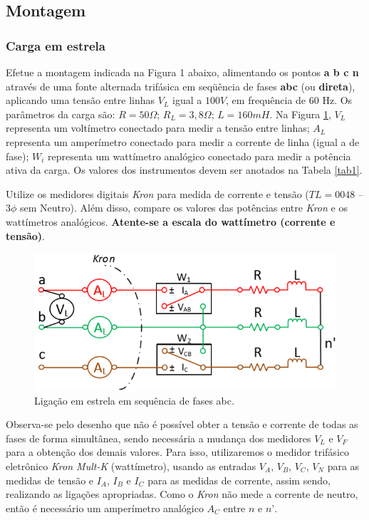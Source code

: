 \documentclass[a4paper,12pt,oneside,openany,table,xcdraw]{article}
\begin{document}
\subsection{Montagem} %

\subsubsection{Carga em estrela}
 Efetue a montagem indicada na Figura 1 abaixo, alimentando os pontos \textbf{a b c n} através de uma fonte alternada trifásica em seqüência de fases \textbf{abc} (ou \textbf{direta}), aplicando uma tensão entre linhas $V_L$ igual a $100 V$, em frequência de 60 Hz. Os parâmetros da carga são: $R = 50 \Omega$; $R_L = 3,8\Omega$; $L = 160 mH$. Na Figura \ref{fig1}, $V_L$ representa um voltímetro conectado para medir a tensão entre linhas; $A_L$ representa um amperímetro conectado para medir a corrente de linha (igual a de fase); $W_i$ representa um wattímetro analógico conectado para medir a potência ativa da carga. Os valores dos instrumentos devem ser anotados na Tabela \ref{tab1}.  

Utilize os medidores digitais \emph{Kron} para medida de corrente e tensão ($TL = 0048$ – $3\phi$ sem Neutro). Além disso, compare os valores das potências entre \emph{Kron} e os wattímetros analógicos. \textbf{Atente-se a escala do wattímetro (corrente e tensão)}. 
\begin{figure}[H]
\centering
\captionsetup{font=scriptsize}
\includegraphics[width=14cm]{fig1}
\caption{Ligação em estrela em sequência de fases abc.}
\label{fig1}
\end{figure}
Observa-se pelo desenho que não é possível obter a tensão e corrente de todas as fases de forma simultânea, sendo necessária a mudança dos medidores $V_L$ e $V_F$ para a obtenção dos demais valores. Para isso, utilizaremos o medidor trifásico eletrônico \textit{Kron Mult-K} (wattímetro),  usando as entradas $V_A$, $V_B$, $V_C$, $V_N$ para as medidas de tensão e $I_A$, $I_B$ e $I_C$ para as medidas de corrente, assim sendo, realizando as ligações apropriadas. Como o \textit{Kron} não mede a corrente de neutro, então é necessário um amperímetro analógico $A_C$ entre $n$ e $n’$.
\end{document}

